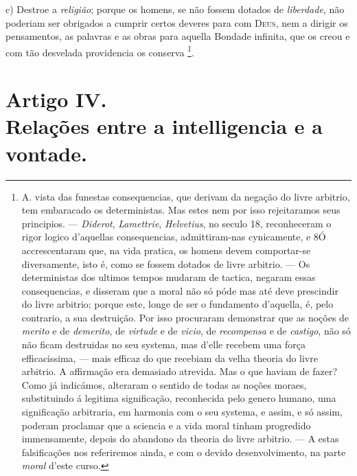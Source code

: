 c) Destroe a \emph{religião}; porque os homens, se não fossem dotados de \emph{liberdade}, não poderiam ser obrigados a cumprir certos deveres para com \textsc{Deus}, nem a dirigir os pensamentos, as palavras e as obras para aquella Bondade infinita, que os creou e com tão desvelada providencia os conserva \footnote{A. vista das funestas consequencias, que derivam da negação do livre arbitrio, tem embaracado os deterministas. Mas estes nem por isso rejeitaramos seus principios. --- \emph{Diderot}, \emph{Lamettrie}, \emph{Helvetius}, no seculo 18, reconheceram o rigor logico d'aquellas consequencias, admittiram-nas cynicamente, e 8Ó accrescentaram que, na vida pratica, os homens devem comportar-se diversamente, isto é, como se fossem dotados de livre arbitrio. --- Os deterministas dos ultimos tempos mudaram de tactica, negaram essas consequencias, e disseram que a moral não só póde mas até deve prescindir do livre arbitrio; porque este, longe de ser o fundamento d'aquella, é, pelo contrario, a sua destruição. Por isso procuraram demonstrar que as noções de \emph{merito} e de \emph{demerito}, de \emph{virtude} e de \emph{vicio}, de \emph{recompensa} e de \emph{castigo}, não só não ficam destruidas no seu systema, mas d'elle recebem uma força efficacissima, --- mais efficaz do que recebiam da velha theoria do livre arbitrio. A affirmação era demasiado atrevida. Mas o que haviam de fazer? Como já indicámos, alteraram o sentido de todas as noções moraes, substituindo á legitima significação, reconhecida pelo genero humano, uma significação arbitraria, em harmonia com o seu systema, e assim, e só assim, poderam proclamar que a sciencia e a vida moral tinham progredido immensamente, depois do abandono da theoria do livre arbitrio. --- A estas falsificações nos referiremos ainda, e com o devido desenvolvimento, na parte \emph{moral} d'este curso.}.


\section*{Artigo IV.\\ Relações entre a intelligencia e a vontade.}


